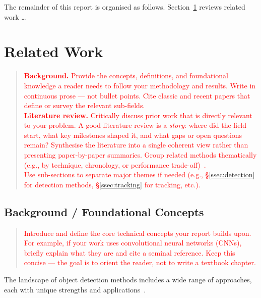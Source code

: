 \documentclass[journal, 10pt, twoside]{IEEEtran}
\begin{document}
The remainder of this report is organised as follows. Section~\ref{sec:related_work} reviews related work \dots

\section{Related Work}
\label{sec:related_work}

\begin{quote}
  \textcolor{red}{%
    \textbf{Background.}  Provide the concepts, definitions, and foundational knowledge a reader needs to follow your methodology and results.  Write in continuous prose --- not bullet points.  Cite classic and recent papers that define or survey the relevant sub-fields.\\[4pt]
    \textbf{Literature review.}  Critically discuss prior work that is directly relevant to your problem.  A good literature review is a \emph{story}: where did the field start, what key milestones shaped it, and what gaps or open questions remain?  Synthesise the literature into a single coherent view rather than presenting paper-by-paper summaries. Group related methods thematically (e.g., by technique, chronology, or performance trade-off)~\citep{ming2021deep}.\\[4pt]
    Use sub-sections to separate major themes if needed (e.g., \S\ref{ssec:detection} for detection methods, \S\ref{ssec:tracking} for tracking, etc.).%
  }
\end{quote}

\subsection{Background / Foundational Concepts}
\label{ssec:background}

\begin{quote}
  \textcolor{red}{%
    Introduce and define the core technical concepts your report builds upon. For example, if your work uses convolutional neural networks (CNNs), briefly explain what they are and cite a seminal reference.  Keep this concise --- the goal is to orient the reader, not to write a textbook chapter.%
  }
\end{quote}

The landscape of object detection methods includes a wide range of approaches, each with unique strengths and applications~\citep{zhao2019object}.
\end{document}
